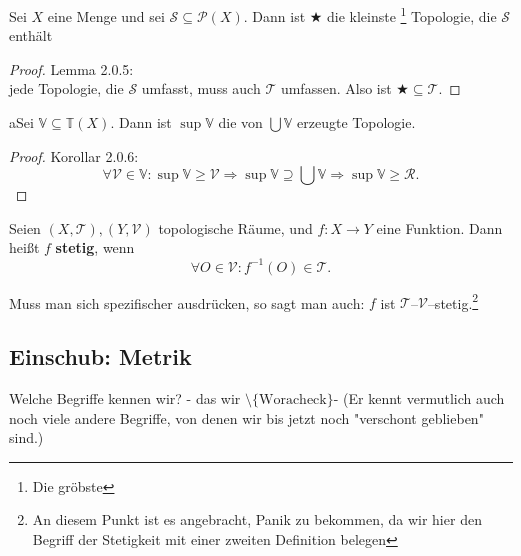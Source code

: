 {
Sei $X$ eine Menge und sei $\mathcal{S} \subseteq \mathcal{P}(X)$. 
Dann ist $\bigstar$ die kleinste \footnote{Die gröbste} Topologie, die $\mathcal{S}$ enthält
}
\begin{proof}{Lemma 2.0.5: }\\
  jede Topologie, die $\mathcal{S}$ umfasst, muss auch $\mathcal{T}$ umfassen.  
  Also ist $\bigstar \subseteq \mathcal{T}$.
\end{proof}


\begin{corollary}{}
  aSei $\mathbb{V} \subseteq \mathbb{T}(X)$.  
  Dann ist $\sup \mathbb{V}$ die von $\bigcup \mathbb{V}$ erzeugte Topologie.
\end{corollary}

\begin{proof}{Korollar 2.0.6:}\\
  \begin{equation*}
  \forall \mathcal{V} \in \mathbb{V} : 
  \sup \mathbb{V} \ge \mathcal{V}\Rightarrow
  \sup \mathbb{V} \supseteq \bigcup \mathbb{V}\Rightarrow
  \sup \mathbb{V}  \ge \mathcal{R}.
  \end{equation*}
\end{proof}

{
Seien $(X, \mathcal{T}), (Y, \mathcal{V})$ topologische Räume, und $f : X \to Y$ eine Funktion.  
Dann heißt $f$ \textbf{stetig}, wenn
\begin{equation*}
  \forall O \in \mathcal{V} : f^{-1}(O) \in \mathcal{T}.
\end{equation*}

Muss man sich spezifischer ausdrücken, so sagt man auch:  
$f$ ist $\mathcal{T}$–$\mathcal{V}$–stetig.\footnote{ An diesem Punkt ist es 
angebracht, Panik zu bekommen, da wir hier den Begriff der Stetigkeit mit einer zweiten
Definition belegen}

}
\subsection{Einschub: Metrik}

Welche Begriffe kennen wir? - das wir $\setminus\{\text{Woracheck}\}$-
(Er kennt vermutlich auch noch viele andere Begriffe, von denen wir bis jetzt noch 
"verschont geblieben" sind.)

